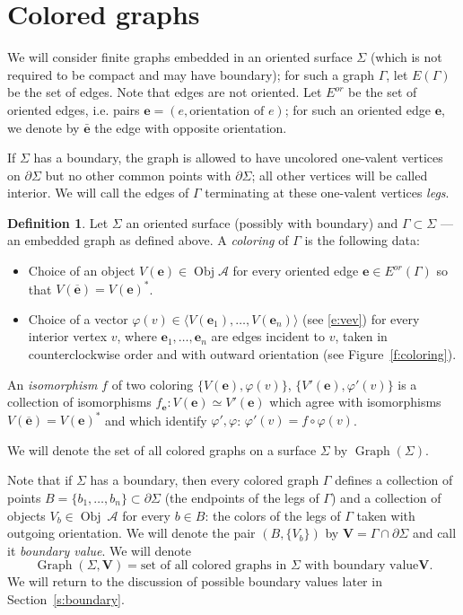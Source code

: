 \documentclass{amsart}
\theoremstyle{definition}
\newtheorem{definition}[theorem]{Definition}
\theoremstyle{remark}
\numberwithin{equation}{section}
\newcommand{\firef}[1]{Figure~{\rm\ref{#1}}}
\newcommand{\seref}[1]{Section~{\rm\ref{#1}}}
\newcommand{\ov}{\overline}
\newcommand{\del}{\partial}
\newcommand{\<}{\langle}
\renewcommand{\>}{\rangle}
\newcommand{\A}{\mathcal{A}}      %
\newcommand{\ee}{\mathbf{e}}       %
\newcommand{\VV}{\mathbf{V}}       %
\newcommand{\Ga}{\Gamma}
\newcommand{\ph}{\varphi}
\newcommand{\Si}{\Sigma}
\DeclareMathOperator{\Obj}{Obj}
\DeclareMathOperator{\Gr}{Graph}
\begin{document}
\section{Colored graphs}\label{s:colored}
We will consider finite  graphs embedded in an oriented surface $\Si$
(which is not required to be compact and may have boundary); for such a
graph $\Ga$, let $E(\Ga)$ be the set of edges. Note that edges are not
oriented. Let $E^{or}$ be the set of oriented edges, i.e. pairs $\ee=(e,
\text{orientation of } e)$; for such an oriented edge $\ee$, we denote by
$\bar{\ee}$ the edge with opposite orientation.

If $\Si$ has a boundary, the graph is allowed to have uncolored one-valent
vertices on $\del \Si$ but no other common points with $\del \Si$; all
other  vertices will  be called interior.  We will  call the edges of $\Ga$
terminating at these  one-valent vertices {\em legs}.   
\begin{definition}\label{d:coloring} Let $\Si$ an oriented surface
(possibly with boundary) and $\Ga\subset \Si$ --- an embedded graph as
defined above.  A {\em coloring} of $\Ga$ is the
following data:

  \begin{itemize}
    \item Choice of an object $V(\ee)\in \Obj \A$ for every oriented edge
        $\ee\in E^{or}(\Ga)$ so that $V(\ov{\ee})=V(\ee)^*$.
    \item Choice of a vector $\ph(v)\in \<V(\ee_1),\dots,V(\ee_n)\>$ 
      (see \eqref{e:vev})  for    every interior vertex $v$, where 
      $\ee_1, \dots, \ee_n$ are edges incident to $v$, taken in counterclockwise 
      order and with outward orientation (see \firef{f:coloring}). 
\end{itemize}

An {\em isomorphism} $f$ of two coloring $\{V(\ee), \ph(v)\}$, $\{V'(\ee), 
\ph'(v)\}$ is a collection of isomorphisms $f_\ee\colon V(\ee)\simeq 
V'(\ee)$ which  agree  with isomorphisms $V(\ov{\ee})=V(\ee)^*$ and which 
identify $\ph', \ph$:  $\ph'(v)=f\circ\ph(v)$. 

We will denote the set of all colored graphs on a surface $\Si$ by
$\Gr(\Si)$.
\end{definition}

Note that if $\Si$ has a boundary, then every colored graph $\Ga$ defines
a collection of points $B=\{b_1,\dots, b_n\}\subset \del \Si$ (the
endpoints of the legs of $\Ga$) and a collection of objects $V_b\in \Obj\
\A$ for every $b \in B$: the colors of the legs of $\Ga$ taken with
outgoing orientation. We will denote the pair $(B, \{V_b\})$ by
$\VV=\Ga\cap \del\Si$ and call it {\em boundary value}. We will denote  
$$
\Gr(\Si, \VV)=\text{set of all colored graphs in $\Si$ with boundary value
} \VV.
$$ 
We will return to the discussion of possible boundary values  later in
\seref{s:boundary}. 
\end{document}
